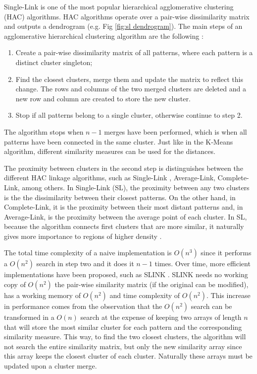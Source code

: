 Single-Link \cite{sneath1962numerical} is one of the most popular hierarchical agglomerative clustering (HAC) algorithms.
HAC algorithms operate over a pair-wise dissimilarity matrix and outputs a dendrogram (e.g. Fig \ref{fig:sl dendrogram}).
The main steps of an agglomerative hierarchical clustering algorithm are the following \cite{Jain1999}:
\begin{enumerate}
    \item Create a pair-wise dissimilarity matrix of all patterns, where each pattern is a distinct cluster singleton;

    \item Find the closest clusters, merge them and update the matrix to reflect this change. The rows and columns of the two merged clusters are deleted and a new row and column are created to store the new cluster.%

    \item Stop if all patterns belong to a single cluster, otherwise continue to step 2.
\end{enumerate}

The algorithm stops when $n-1$ merges have been performed, which is when all patterns have been connected in the same cluster.
Just like in the K-Means algorithm, different similarity measures can be used for the distances.

The proximity between clusters in the second step is distinguishes between the different HAC linkage algorithms, such as Single-Link , Average-Link, Complete-Link, among others.
In Single-Link (SL), the proximity between any two clusters is the the dissimilarity between their closest patterns.
On the other hand, in Complete-Link, it is the proximity between their most distant patterns and, in Average-Link, is the proximity between the average point of each cluster.
In SL, because the algorithm connects first clusters that are more similar, it naturally gives more importance to regions of higher density \cite{Aggarwal2014}.

The total time complexity of a naive implementation is $O(n^3)$ since it performs a $O(n^2)$ search in step two and it does it $n-1$ times.
Over time, more efficient implementations have been proposed, such as SLINK \cite{Sibson1973}.
SLINK needs no working copy of $O(n^2)$ the pair-wise similarity matrix (if the original can be modified), has a working memory of $O(n^2)$ and time complexity of $O(n^2)$.
This increase in performance comes from the observation that the $O(n^2)$ search can be transformed in a $O(n)$ search at the expense of keeping two arrays of length $n$ that will store the most similar cluster for each pattern and the corresponding similarity measure.
This way, to find the two closest clusters, the algorithm will not search the entire similarity matrix, but only the new similarity array since this array keeps the closest cluster of each cluster.
Naturally these arrays must be updated upon a cluster merge.

